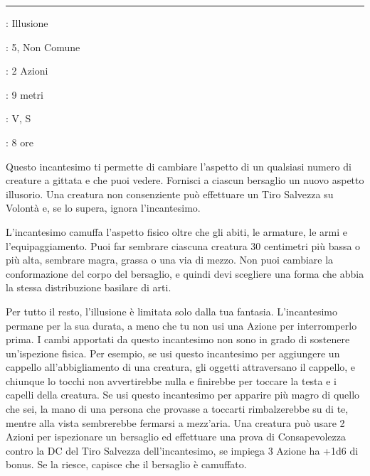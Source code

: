 \begin{multicols}{2}
\smallskip\noindent\rule{\linewidth}{2pt} \hypertarget{Sembrare}{}\smallskip{}
\noindent
\begin{description}[noitemsep, topsep=0pt, parsep=0pt, partopsep=0pt, leftmargin=0cm, labelwidth=2.8cm]
	\item[\textbf{Lista di Magia}]: Illusione
	\item[\textbf{Livello}]: 5, Non Comune
	\item[\textbf{T. di Lancio}]: 2 Azioni
	\item[\textbf{Gittata}]: 9 metri
	\item[\textbf{Componenti}]: V, S
	\item[\textbf{Durata}]: 8 ore
\end{description}

Questo incantesimo ti permette di cambiare l'aspetto di un qualsiasi numero di creature a gittata e che puoi vedere. Fornisci a ciascun bersaglio un nuovo aspetto illusorio. Una creatura non consenziente può effettuare un Tiro Salvezza su Volontà e, se lo supera, ignora l'incantesimo.

L'incantesimo camuffa l'aspetto fisico oltre che gli abiti, le armature, le armi e l'equipaggiamento. Puoi far sembrare ciascuna creatura 30 centimetri più bassa o più alta, sembrare magra, grassa o una via di mezzo. Non puoi cambiare la conformazione del corpo del bersaglio, e quindi devi scegliere una forma che abbia la stessa distribuzione basilare di arti.

Per tutto il resto, l'illusione è limitata solo dalla tua fantasia. L'incantesimo permane per la sua durata, a meno che tu non usi una Azione per interromperlo prima. I cambi apportati da questo incantesimo non sono in grado di sostenere un'ispezione fisica. Per esempio, se usi questo incantesimo per aggiungere un cappello all'abbigliamento di una creatura, gli oggetti attraversano il cappello, e chiunque lo tocchi non avvertirebbe nulla e finirebbe per toccare la testa e i capelli della creatura.
Se usi questo incantesimo per apparire più magro di quello che sei, la mano di una persona che provasse a toccarti rimbalzerebbe su di te, mentre alla vista sembrerebbe fermarsi a mezz'aria. Una creatura può usare 2 Azioni per ispezionare un bersaglio ed effettuare una prova di Consapevolezza contro la DC del Tiro Salvezza dell'incantesimo, se impiega 3 Azione ha +1d6 di bonus. Se la riesce, capisce che il bersaglio è camuffato.


\end{multicols}
